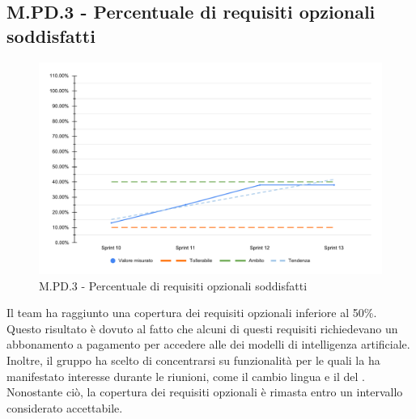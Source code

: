 \subsection{M.PD.3 - Percentuale di requisiti opzionali soddisfatti}

\begin{figure}[H]
    \centering
    \includegraphics[width=\textwidth]{assets/requisiti_opzionali_soddisfatti.pdf}
    \caption{M.PD.3 - Percentuale di requisiti opzionali soddisfatti}
\end{figure}

\par Il team ha raggiunto una copertura dei requisiti opzionali inferiore al 50\%. Questo risultato è dovuto al fatto che alcuni di questi requisiti richiedevano un abbonamento a pagamento per accedere alle  dei modelli di intelligenza artificiale. Inoltre, il gruppo ha scelto di concentrarsi su funzionalità per le quali la  ha manifestato interesse durante le riunioni, come il cambio lingua e il  del . Nonostante ciò, la copertura dei requisiti opzionali è rimasta entro un intervallo considerato accettabile.